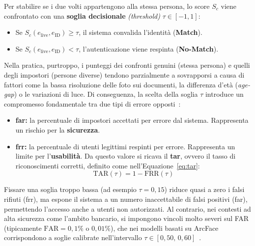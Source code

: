 Per stabilire se i due volti appartengono alla stessa persona, lo score $S_c$ viene confrontato con una \textbf{soglia decisionale} \textit{(threshold)} $\tau \in [-1, 1]$:
\begin{itemize}
    \item Se $S_c(e_{\text{live}}, e_{\text{ID}}) \ge \tau$, il sistema convalida l'identità (\textbf{Match}).
    \item Se $S_c(e_{\text{live}}, e_{\text{ID}}) < \tau$, l'autenticazione viene respinta (\textbf{No-Match}).
\end{itemize}
Nella pratica, purtroppo, i punteggi dei confronti genuini (stessa persona) e quelli degli impostori (persone diverse) tendono parzialmente a sovrapporsi a causa di fattori come la bassa risoluzione delle foto sui documenti, la differenza d'età (\textit{age-gap}) o le variazioni di luce. 
Di conseguenza, la scelta della soglia $\tau$ introduce un compromesso fondamentale tra due tipi di errore opposti~\cite{shiDocFaceMatchingID2018}:
\begin{itemize}
    \item \textbf{\gls{far}:} la percentuale di impostori accettati per errore dal sistema. Rappresenta un rischio per la \textbf{sicurezza}.
    \item \textbf{\gls{frr}:} la percentuale di utenti legittimi respinti per errore. Rappresenta un limite per l'\textbf{usabilità}. Da questo valore si ricava il \textbf{\gls{tar}}, ovvero il tasso di riconoscimenti corretti, definito come nell'Equazione~\eqref{eq:tar}:
    \begin{equation}
        \label{eq:tar}
        \text{TAR}(\tau) = 1 - \text{FRR}(\tau)
    \end{equation}
\end{itemize}
Fissare una soglia troppo bassa (ad esempio $\tau = 0{,}15$) riduce quasi a zero i falsi rifiuti (\gls{frr}), ma espone il sistema a un numero inaccettabile di falsi positivi (\gls{far}), permettendo l'accesso anche a utenti non autorizzati. Al contrario, nei contesti ad alta sicurezza come l'ambito bancario, si impongono vincoli molto severi sul FAR (tipicamente $\text{FAR} = 0{,}1\%$ o $0{,}01\%$), che nei modelli basati su ArcFace corrispondono a soglie calibrate nell'intervallo $\tau \in [0{,}50, \, 0{,}60]$~\cite{shiDocFaceMatchingID2018}. 

